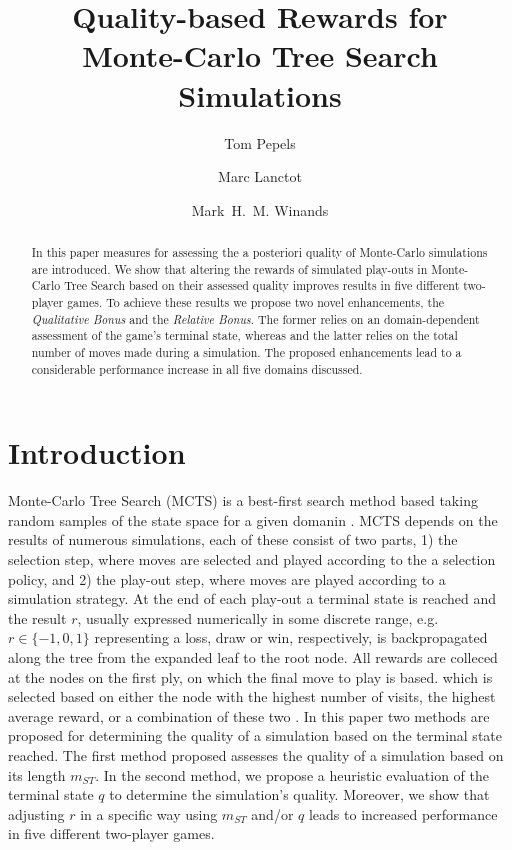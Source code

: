 \documentclass{ecai2010}
\begin{document}
\title{Quality-based Rewards for \\ Monte-Carlo Tree Search Simulations}

\author{Tom Pepels \and Marc Lanctot \and Mark~H.~M. Winands  }

\maketitle


\begin{abstract}
In this paper measures for assessing the a posteriori quality of Monte-Carlo simulations are introduced. We show that altering the rewards of simulated play-outs in Monte-Carlo Tree Search based on their assessed quality improves results in five different two-player games. To achieve these results we propose two novel enhancements, the \emph{Qualitative Bonus} and the \emph{Relative Bonus}. The former relies on an domain-dependent assessment of the game's terminal state, whereas and the latter relies on the total number of moves made during a simulation. The proposed enhancements lead to a considerable performance increase in all five domains discussed.
\end{abstract}

\section{Introduction}
\label{sec:intro}
Monte-Carlo Tree Search (MCTS) is a best-first search method based taking random samples of the state space for a given domanin \cite{kocsis2006bandit, coulom2007efficient}. MCTS depends on the results of numerous simulations, each of these consist of two parts, 1) the selection step, where moves are selected and played according to the a selection policy, and 2) the play-out step, where moves are played according to a simulation strategy. At the end of each play-out a terminal state is reached and the result $r$, usually expressed numerically in some discrete range, e.g. $r \in \{-1, 0, 1\}$ representing a loss, draw or win, respectively, is backpropagated along the tree from the expanded leaf to the root node. All rewards are colleced at the nodes on the first ply, on which the final move to play is based. which is selected based on either the node with the highest number of visits, the highest average reward, or a combination of these two \cite{chaslot2008progressive}. In this paper two methods are proposed for determining the quality of a simulation based on the terminal state reached. The first method proposed assesses the quality of a simulation based on its length $m_{ST}$. In the second method, we propose a heuristic evaluation of the terminal state $q$ to determine the simulation's quality. Moreover, we show that adjusting $r$ in a specific way using  $m_{ST}$ and/or $q$ leads to increased performance in five different two-player games.
\end{document}
